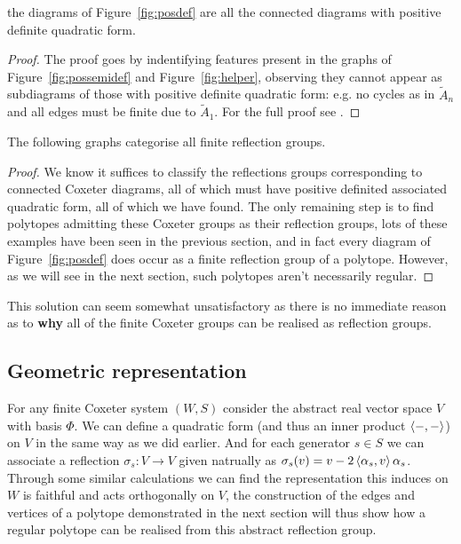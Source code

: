 \documentclass[../main.tex]{subfiles}
\begin{document}
\begin{theorem}
    the diagrams of Figure~\ref{fig:posdef} are all the connected diagrams with positive definite quadratic form.
    \begin{proof}
        The proof goes by indentifying features present in the graphs of Figure~\ref{fig:possemidef} and Figure~\ref{fig:helper}, observing they cannot appear as subdiagrams of those with positive definite quadratic form: e.g. no cycles as in $\tilde{A}_n$ and all edges must be finite due to $\tilde{A}_1$. For the full proof see \cite{Humphreys1990}.
    \end{proof}
\end{theorem}

\begin{corollary}
    The following graphs categorise all finite reflection groups.
    \begin{proof}
        We know it suffices to classify the reflections groups corresponding to connected Coxeter diagrams, all of which must have positive definited associated quadratic form, all of which we have found. The only remaining step is to find polytopes admitting these Coxeter groups as their reflection groups, lots of these examples have been seen in the previous section, and in fact every diagram of Figure~\ref{fig:posdef} does occur as a finite reflection group of a polytope. However, as we will see in the next section, such polytopes aren't necessarily regular.
    \end{proof}
\end{corollary}

This solution can seem somewhat unsatisfactory as there is no immediate reason as to \textbf{why} all of the finite Coxeter groups can be realised as reflection groups.

\subsection{Geometric representation}\label{subsection:geometric representation}

For any finite Coxeter system $(W,S)$ consider the abstract real vector space $V$ with basis $\Phi$. We can define a quadratic form (and thus an inner product  $\left\langle -,- \right\rangle$) on $V$ in the same way as we did earlier. And for each generator $s\in S$ we can associate a reflection $\sigma_s:V\rightarrow V$ given natrually as $\sigma_s (v) = v-2\left\langle \alpha_s,v \right\rangle\alpha_s$. Through some similar calculations we can find the representation this induces on $W$ is faithful and acts orthogonally on $V$, the construction of the edges and vertices of a polytope demonstrated in the next section will thus show how a regular polytope can be realised from this abstract reflection group.
\end{document}
